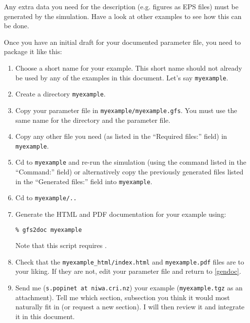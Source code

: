 \documentclass[a4paper]{article}
\begin{document}
Any extra data you need for the description (e.g. figures as EPS files) must be generated by the simulation. Have a look at other examples to see how this can be done.

Once you have an initial draft for your documented parameter file, you need to package it like this:
\begin{enumerate}
\item Choose a short name for your example. This short name should not already be used by any of the examples in this document. Let's say {\tt myexample}.
\item Create a directory {\tt myexample}.
\item Copy your parameter file in {\tt myexample/myexample.gfs}. You must use the same name for the directory and the parameter file.
\item Copy any other file you need (as listed in the ``Required files:'' field) in {\tt myexample}.
\item Cd to {\tt myexample} and re-run the simulation (using the command listed in the ``Command:'' field) or alternatively copy the previously generated files listed in the ``Generated files:'' field into {\tt myexample}.
\item Cd to {\tt myexample/..}
\item\label{gendoc} Generate the HTML and PDF documentation for your example using:
\begin{verbatim}
% gfs2doc myexample
\end{verbatim}
Note that this script requires .
\item Check that the {\tt myexample\_html/index.html} and {\tt myexample.pdf} files are to your liking. If they are not, edit your parameter file and return to \ref{gendoc}.
\item Send me ({\tt s.popinet at niwa.cri.nz}) your example ({\tt myexample.tgz} as an attachment). Tell me which section, subsection you think it would most naturally fit in (or request a new section). I will then review it and integrate it in this document.
\end{enumerate}
\end{document}
